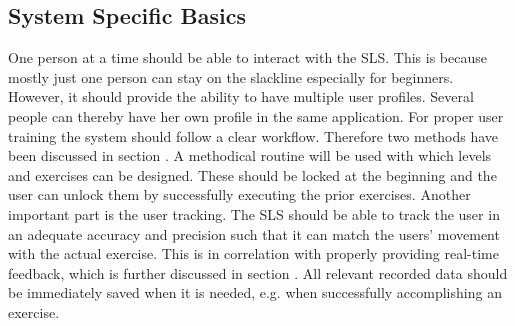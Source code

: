 \subsection{System Specific Basics}\label{systemBasics}
One person at a time should be able to interact with the SLS. This is because mostly just one person can stay on the slackline especially for beginners. However, it should provide the ability to have multiple user profiles. Several people can thereby have her own profile in the same application. For proper user training the system should follow a clear workflow. Therefore two methods have been discussed in section \textit{}. A methodical routine will be used with which levels and exercises can be designed. These should be locked at the beginning and the user can unlock them by successfully executing the prior exercises. Another important part is the user tracking. The SLS should be able to track the user in an adequate accuracy and precision such that it can match the users' movement with the actual exercise. %
This is in correlation with properly providing real-time feedback, which is further discussed in section \textit{}. All relevant recorded data should be immediately saved when it is needed, e.g. when successfully accomplishing an exercise.

\begin{comment}
- System should be able to track user appropriately
- All relevant data should be immediately saved when it is needed (unlocking exercise/stage, failing/accomplish exercise)
- Information about where the user currently is should be given --> title
- User selection
- Also a possibility to go to the last screen if she misclicks should be given.
\end{comment}